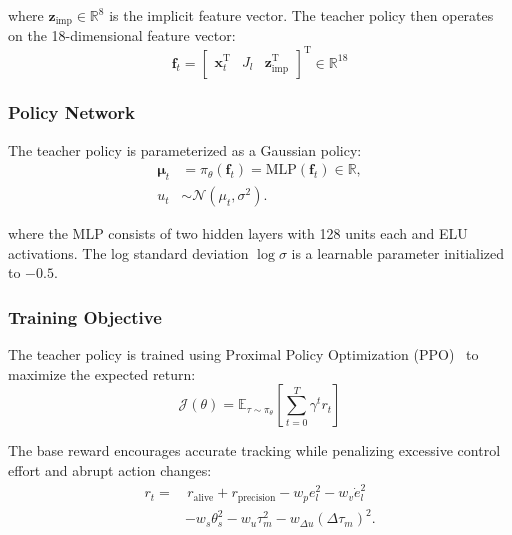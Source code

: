 \documentclass[letterpaper,journal]{IEEEtran}
\begin{document}
\noindent where $\bm{z}_{\text{imp}} \in \mathbb{R}^8$ is the implicit feature vector. The teacher policy then operates on the 18-dimensional feature vector:
\begin{equation}
\bm{f}_t = \begin{bmatrix}
\bm{x}_t^\mathrm{T} & J_l & \bm{z}_{\text{imp}}^\mathrm{T}
\end{bmatrix}^\mathrm{T} \in \mathbb{R}^{18} \label{eq:teacher_features}
\end{equation}

\subsubsection{Policy Network}

The teacher policy is parameterized as a Gaussian policy:
\begin{equation}
\begin{aligned}
\bm{\mu}_t &= \pi_\theta(\bm{f}_t) = \text{MLP}(\bm{f}_t) \in \mathbb{R}, \\
u_t &\sim \mathcal{N}(\mu_t, \sigma^2).
\end{aligned}
\label{eq:teacher_policy}
\end{equation}

\noindent where the MLP consists of two hidden layers with 128 units each and ELU activations. The log standard deviation $\log \sigma$ is a learnable parameter initialized to $-0.5$.

\subsubsection{Training Objective}

The teacher policy is trained using Proximal Policy Optimization (PPO)~\cite{schulman2017Proximal} to maximize the expected return:
\begin{equation}
\mathcal{J}(\theta) = \mathbb{E}_{\tau \sim \pi_\theta} \left[ \sum_{t=0}^T \gamma^t r_t \right] \label{eq:ppo_objective}
\end{equation}

The base reward encourages accurate tracking while penalizing excessive control effort and abrupt action changes:
\begin{align}
r_t = &\, r_{\text{alive}} + r_{\text{precision}} - w_p e_{l}^2 - w_v \dot{e}_{l}^2 \nonumber \\
&- w_s \theta_s^2 - w_u \tau_m^2 - w_{\Delta u} (\Delta \tau_m)^2. \label{eq:reward}
\end{align}
\end{document}
